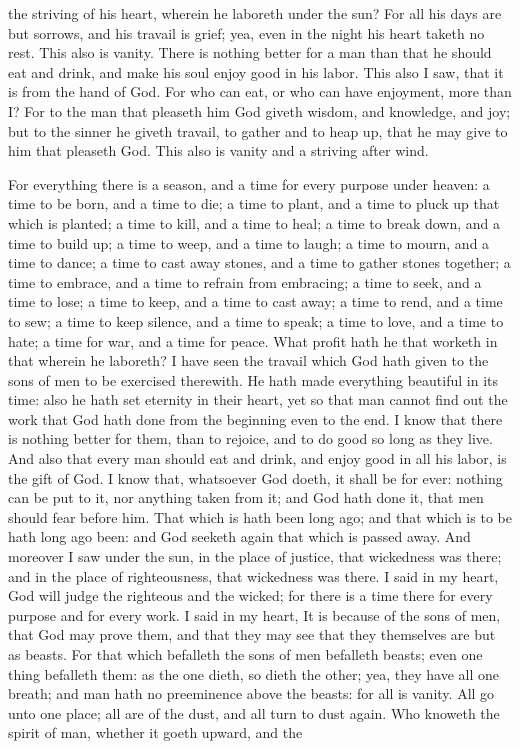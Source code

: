 the striving of his heart, wherein he laboreth under the sun? For all his days are but sorrows, and his travail is grief; yea, even in the night his heart taketh no rest. This also is vanity.  There is nothing better for a man than that he should eat and drink, and make his soul enjoy good in his labor. This also I saw, that it is from the hand of God. For who can eat, or who can have enjoyment, more than I? For to the man that pleaseth him God giveth wisdom, and knowledge, and joy; but to the sinner he giveth travail, to gather and to heap up, that he may give to him that pleaseth God. This also is vanity and a striving after wind. 

For everything there is a season, and a time for every purpose under heaven: a time to be born, and a time to die; a time to plant, and a time to pluck up that which is planted; a time to kill, and a time to heal; a time to break down, and a time to build up; a time to weep, and a time to laugh; a time to mourn, and a time to dance; a time to cast away stones, and a time to gather stones together; a time to embrace, and a time to refrain from embracing; a time to seek, and a time to lose; a time to keep, and a time to cast away; a time to rend, and a time to sew; a time to keep silence, and a time to speak; a time to love, and a time to hate; a time for war, and a time for peace. What profit hath he that worketh in that wherein he laboreth? I have seen the travail which God hath given to the sons of men to be exercised therewith. He hath made everything beautiful in its time: also he hath set eternity in their heart, yet so that man cannot find out the work that God hath done from the beginning even to the end. I know that there is nothing better for them, than to rejoice, and to do good so long as they live. And also that every man should eat and drink, and enjoy good in all his labor, is the gift of God. I know that, whatsoever God doeth, it shall be for ever: nothing can be put to it, nor anything taken from it; and God hath done it, that men should fear before him. That which is hath been long ago; and that which is to be hath long ago been: and God seeketh again that which is passed away.  And moreover I saw under the sun, in the place of justice, that wickedness was there; and in the place of righteousness, that wickedness was there. I said in my heart, God will judge the righteous and the wicked; for there is a time there for every purpose and for every work. I said in my heart, It is because of the sons of men, that God may prove them, and that they may see that they themselves are but as beasts. For that which befalleth the sons of men befalleth beasts; even one thing befalleth them: as the one dieth, so dieth the other; yea, they have all one breath; and man hath no preeminence above the beasts: for all is vanity. All go unto one place; all are of the dust, and all turn to dust again. Who knoweth the spirit of man, whether it goeth upward, and the 